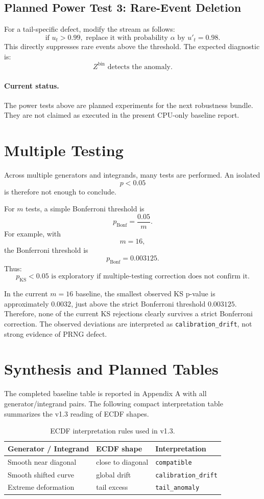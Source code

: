 \documentclass[11pt,a4paper]{article}
\newcommand{\KS}{\mathrm{KS}}
\begin{document}
\subsection{Planned Power Test 3: Rare-Event Deletion}

For a tail-specific defect, modify the stream as follows:
\[
\text{if }u_t>0.99,\text{ replace it with probability }\alpha\text{ by }u'_t=0.98.
\]
This directly suppresses rare events above the threshold. The expected diagnostic is:
\[
\boxed{
Z^{\mathrm{bin}}\text{ detects the anomaly.}
}
\]

\paragraph{Current status.}
The power tests above are planned experiments for the next robustness bundle. They are not claimed as executed in the present CPU-only baseline report.

\section{Multiple Testing}

Across multiple generators and integrands, many tests are performed. An isolated
\[
p<0.05
\]
is therefore not enough to conclude.

For $m$ tests, a simple Bonferroni threshold is
\[
p_{\mathrm{Bonf}}=\frac{0.05}{m}.
\]
For example, with
\[
m=16,
\]
the Bonferroni threshold is
\[
p_{\mathrm{Bonf}}=0.003125.
\]
Thus:
\[
\boxed{
p_{\KS}<0.05\text{ is exploratory if multiple-testing correction does not confirm it.}
}
\]

In the current $m=16$ baseline, the smallest observed KS p-value is approximately $0.0032$, just above the strict Bonferroni threshold $0.003125$. Therefore, none of the current KS rejections clearly survives a strict Bonferroni correction. The observed deviations are interpreted as \texttt{calibration\_drift}, not strong evidence of PRNG defect.

\section{Synthesis and Planned Tables}

The completed baseline table is reported in Appendix A with all generator/integrand pairs. The following compact interpretation table summarizes the v1.3 reading of ECDF shapes.

\begin{table}[h]
\centering
\caption{ECDF interpretation rules used in v1.3.}
\begin{tabular}{lll}
\toprule
Generator / Integrand & ECDF shape & Interpretation \\
\midrule
Smooth near diagonal & close to diagonal & \texttt{compatible} \\
Smooth shifted curve & global drift & \texttt{calibration\_drift} \\
Extreme deformation & tail excess & \texttt{tail\_anomaly} \\
\bottomrule
\end{tabular}
\end{table}
\end{document}
